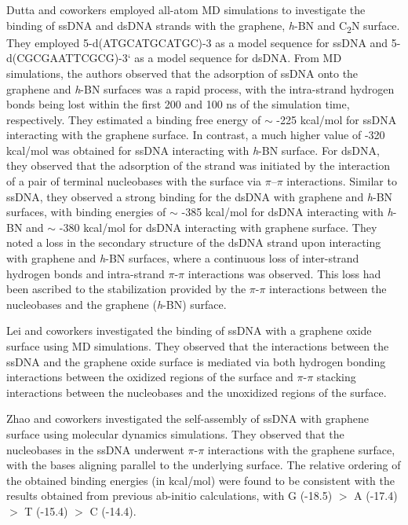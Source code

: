 Dutta and coworkers employed all-atom MD simulations to investigate the binding of ssDNA and dsDNA strands with the graphene, \textit{h}-BN and C\textsubscript{2}N surface\supercite{mukhopadhyay_screening_2020}. They employed 5-d(ATGCATGCATGC)-3 as a model sequence for ssDNA and 5-d(CGCGAATTCGCG)-3` as a model sequence for dsDNA. From MD simulations, the authors observed that the adsorption of ssDNA onto the graphene and \textit{h}-BN surfaces was a rapid process, with the intra-strand hydrogen bonds being lost within the first 200 and 100 ns of the simulation time, respectively. They estimated a binding free energy of $\sim$ -225 kcal/mol for ssDNA interacting with the graphene surface. In contrast, a much higher value of -320 kcal/mol was obtained for ssDNA interacting with \textit{h}-BN surface. For dsDNA, they observed that the adsorption of the strand was initiated by the interaction of a pair of terminal nucleobases with the surface via $\pi$–$\pi$ interactions. Similar to ssDNA, they observed a strong binding for the dsDNA with graphene and \textit{h}-BN surfaces, with binding energies of $\sim$ -385 kcal/mol for dsDNA interacting with \textit{h}-BN and $\sim$ -380 kcal/mol for dsDNA interacting with graphene surface. They noted a loss in the secondary structure of the dsDNA strand upon interacting with graphene and \textit{h}-BN surfaces, where a continuous loss of inter-strand hydrogen bonds and intra-strand $\pi$-$\pi$ interactions was observed. This loss had been ascribed to the stabilization provided by the $\pi$-$\pi$ interactions between the nucleobases and the graphene (\textit{h}-BN) surface. 

Lei and coworkers investigated the binding of ssDNA with a graphene oxide surface using MD simulations.\supercite{xu_dynamic_2017} They observed that the interactions between the ssDNA and the graphene oxide surface is mediated via both hydrogen bonding interactions between the oxidized regions of the surface and $\pi$-$\pi$ stacking interactions between the nucleobases and the unoxidized regions of the surface.

Zhao and coworkers investigated the self-assembly of ssDNA with graphene surface using molecular dynamics simulations.\supercite{cheng_steered_2012} They observed that the nucleobases in the ssDNA underwent $\pi$-$\pi$ interactions with the graphene surface, with the bases aligning parallel to the underlying surface. The relative ordering of the obtained binding energies (in kcal/mol) were found to be consistent with the results obtained from previous ab-initio calculations, with G (-18.5) $>$ A (-17.4) $>$ T (-15.4) $>$ C (-14.4).

